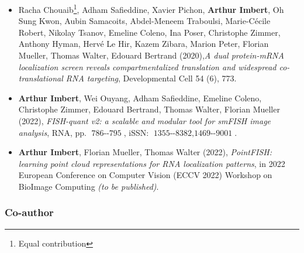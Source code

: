 \begin{itemize}
	\item Racha Chouaib\footnote{Equal contribution}, Adham Safieddine\footnotemark[1], Xavier Pichon\footnotemark[1], \textbf{Arthur Imbert\footnotemark[1]}, Oh Sung Kwon, Aubin Samacoits, Abdel-Meneem Traboulsi, Marie-Cécile Robert, Nikolay Tsanov, Emeline Coleno, Ina Poser, Christophe Zimmer, Anthony Hyman, Hervé Le Hir, Kazem Zibara, Marion Peter, Florian Mueller, Thomas Walter, Edouard Bertrand (2020),\textit{A dual protein-mRNA localization screen reveals compartmentalized translation and widespread co-translational RNA targeting}, Developmental Cell 54 (6), 773.
	\item \textbf{Arthur Imbert}, Wei Ouyang, Adham Safieddine, Emeline Coleno, Christophe Zimmer, Edouard Bertrand, Thomas Walter, Florian Mueller (2022), \textit{FISH-quant v2: a scalable and modular tool for smFISH image analysis}, RNA, pp. $\operatorname{786--795}$, iSSN: $\operatorname{1355--8382, 1469--9001}$.
	\item \textbf{Arthur Imbert}, Florian Mueller, Thomas Walter (2022), \textit{PointFISH: learning point cloud representations for RNA localization patterns}, in 2022 European Conference on Computer Vision (ECCV 2022) Workshop on BioImage Computing \textit{(to be published)}.
\end{itemize}

\subsubsection{Co-author}


